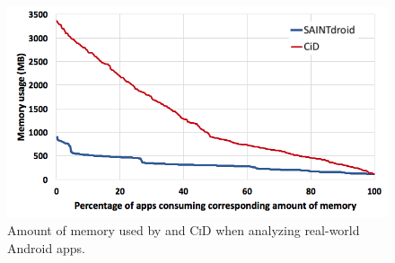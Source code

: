 \begin{figure}[b!]
	\centering
	\includegraphics[width=\linewidth]{images/memory_gd.png}
	\caption{Amount of memory used by \@approach and \textsc{CiD} when analyzing real-world Android apps.}
	\label{fig:memory_gd}
\end{figure}

